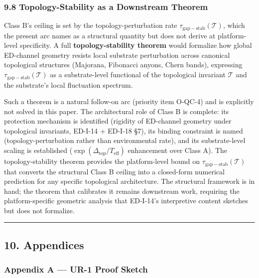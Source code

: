\documentclass[
  11pt,
  a4paper,
]{article}
\begin{document}
\subsubsection{9.8 Topology-Stability as a Downstream
Theorem}\label{topology-stability-as-a-downstream-theorem}

Class B's ceiling is set by the topology-perturbation rate
\(\tau_{\mathrm{gap-stab}}(\mathcal{T})\), which the present arc names
as a structural quantity but does not derive at platform-level
specificity. A full \textbf{topology-stability theorem} would formalize
how global ED-channel geometry resists local substrate perturbation
across canonical topological structures (Majorana, Fibonacci anyons,
Chern bands), expressing \(\tau_{\mathrm{gap-stab}}(\mathcal{T})\) as a
substrate-level functional of the topological invariant \(\mathcal{T}\)
and the substrate's local fluctuation spectrum.

Such a theorem is a natural follow-on arc (priority item O-QC-4) and is
explicitly not solved in this paper. The architectural role of Class B
is complete: its protection mechanism is identified (rigidity of
ED-channel geometry under topological invariants, ED-I-14 + ED-I-18 §7),
its binding constraint is named (topology-perturbation rather than
environmental rate), and its substrate-level scaling is established
(\(\exp(\Delta_{\mathrm{top}}/T_{\mathrm{eff}})\) enhancement over Class
A). The topology-stability theorem provides the platform-level bound on
\(\tau_{\mathrm{gap-stab}}(\mathcal{T})\) that converts the structural
Class B ceiling into a closed-form numerical prediction for any specific
topological architecture. The structural framework is in hand; the
theorem that calibrates it remains downstream work, requiring the
platform-specific geometric analysis that ED-I-14's interpretive content
sketches but does not formalize.

\begin{center}\rule{0.5\linewidth}{0.5pt}\end{center}

\subsection{10. Appendices}\label{appendices}

\subsubsection{Appendix A --- UR-1 Proof
Sketch}\label{appendix-a-ur-1-proof-sketch}
\end{document}
